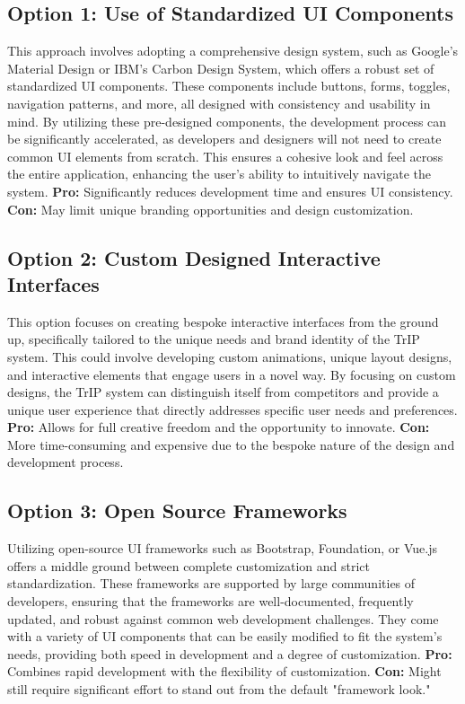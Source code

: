 \subsection*{Option 1: Use of Standardized UI Components}
This approach involves adopting a comprehensive design system, such as Google's Material Design or IBM’s Carbon Design System, which offers a robust set of standardized UI components. These components include buttons, forms, toggles, navigation patterns, and more, all designed with consistency and usability in mind. By utilizing these pre-designed components, the development process can be significantly accelerated, as developers and designers will not need to create common UI elements from scratch. This ensures a cohesive look and feel across the entire application, enhancing the user's ability to intuitively navigate the system.
\textbf{Pro:} Significantly reduces development time and ensures UI consistency.
\textbf{Con:} May limit unique branding opportunities and design customization.

\subsection*{Option 2: Custom Designed Interactive Interfaces}
This option focuses on creating bespoke interactive interfaces from the ground up, specifically tailored to the unique needs and brand identity of the TrIP system. This could involve developing custom animations, unique layout designs, and interactive elements that engage users in a novel way. By focusing on custom designs, the TrIP system can distinguish itself from competitors and provide a unique user experience that directly addresses specific user needs and preferences.
\textbf{Pro:} Allows for full creative freedom and the opportunity to innovate.
\textbf{Con:} More time-consuming and expensive due to the bespoke nature of the design and development process.

\subsection*{Option 3: Open Source Frameworks}
Utilizing open-source UI frameworks such as Bootstrap, Foundation, or Vue.js offers a middle ground between complete customization and strict standardization. These frameworks are supported by large communities of developers, ensuring that the frameworks are well-documented, frequently updated, and robust against common web development challenges. They come with a variety of UI components that can be easily modified to fit the system’s needs, providing both speed in development and a degree of customization.
\textbf{Pro:} Combines rapid development with the flexibility of customization.
\textbf{Con:} Might still require significant effort to stand out from the default "framework look."

